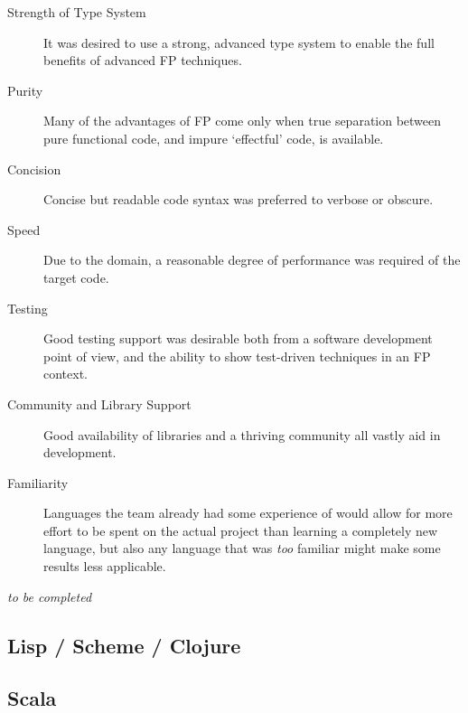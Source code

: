 \begin{description}
	\item[Strength of Type System] It was desired to use a strong, advanced type system to enable the full benefits of advanced FP techniques.
	\item[Purity] Many of the advantages of FP come only when true separation between pure functional code, and impure `effectful' code, is available.\cite[-10em]{hudak1989conception}
	\item[Concision] Concise but readable code syntax was preferred to verbose or obscure.
	\item[Speed] Due to the domain, a reasonable degree of performance was required of the target code.
	\item[Testing] Good testing support was desirable both from a software development point of view, and the ability to show test-driven techniques in an FP context.
	\item[Community and Library Support] Good availability of libraries and a thriving community all vastly aid in development.
	\item[Familiarity] Languages the team already had some experience of would allow for more effort to be spent on the actual project than learning a completely new language, but also any language that was \emph{too} familiar might make some results less applicable.
\end{description}

\emph{to be completed}

\subsection{Lisp / Scheme / Clojure}




\subsection{Scala}


